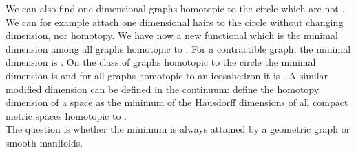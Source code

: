 \documentclass[12pt]{amsart}
\theoremstyle{definition}
\begin{document}
We can also find one-dimensional graphs homotopic to the circle which are not .
We can for example attach one dimensional hairs to the circle without changing dimension,
nor homotopy. We have now a new functional  which is the minimal dimension
among all graphs  homotopic to . For a contractible graph, the minimal dimension
is . On the class of graphs homotopic to the circle the minimal dimension 
is  and for all graphs homotopic to an  icosahedron it is . 
A similar modified dimension  can be defined
in the continuum: define the homotopy dimension of a space  as the minimum of
the Hausdorff dimensions of all compact metric spaces  homotopic to . \\

The question is whether the minimum is always attained by a geometric graph or
smooth manifolds. 


\end{document}
